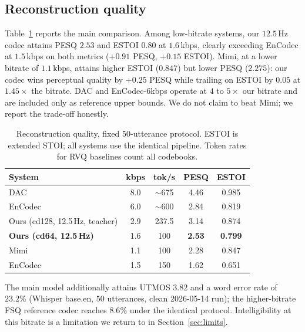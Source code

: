 \documentclass[conference,a4paper]{APSIPA2026}
\begin{document}
\subsection{Reconstruction quality}
\label{sec:recon}

Table~\ref{tab:recon} reports the main comparison. Among low-bitrate systems,
our $12.5$\,Hz codec attains PESQ $2.53$ and ESTOI $0.80$ at $1.6$\,kbps,
clearly exceeding EnCodec at $1.5$\,kbps on both metrics ($+0.91$ PESQ,
$+0.15$ ESTOI). Mimi, at a lower bitrate of $1.1$\,kbps, attains higher ESTOI
($0.847$) but lower PESQ ($2.275$): our codec wins perceptual quality by
$+0.25$ PESQ while trailing on ESTOI by $0.05$ at $1.45\times$ the bitrate. DAC
and EnCodec-6kbps operate at $4$ to $5\times$ our bitrate and are included only
as reference upper bounds. We do not claim to beat Mimi; we report the
trade-off honestly.

\begin{table}[t]
\caption{Reconstruction quality, fixed 50-utterance protocol. ESTOI is
extended STOI; all systems use the identical pipeline. Token rates for RVQ
baselines count all codebooks.}
\label{tab:recon}
\centering
\begin{tabular}{lcccc}
\toprule
System & kbps & tok/s & PESQ & ESTOI \\
\midrule
DAC                 & 8.0 & $\sim$675 & 4.46 & 0.985 \\
EnCodec             & 6.0 & $\sim$600 & 2.84 & 0.819 \\
\midrule
Ours (cd128, 12.5\,Hz, teacher)  & 2.9 & 237.5 & 3.14 & 0.874 \\
\textbf{Ours (cd64, 12.5\,Hz)} & 1.6 & 100 & \textbf{2.53} & \textbf{0.799} \\
Mimi    & 1.1 & 100 & 2.28 & 0.847 \\
EnCodec             & 1.5 & 150 & 1.62 & 0.651 \\
\bottomrule
\end{tabular}
\end{table}

The main model additionally attains UTMOS $3.82$ %
and a word error rate of $23.2\%$ (Whisper base.en, $50$ utterances, clean
2026-05-14 run); the higher-bitrate FSQ reference codec reaches $8.6\%$ under
the identical protocol. Intelligibility at this bitrate is a limitation we
return to in Section~\ref{sec:limits}.
\end{document}
